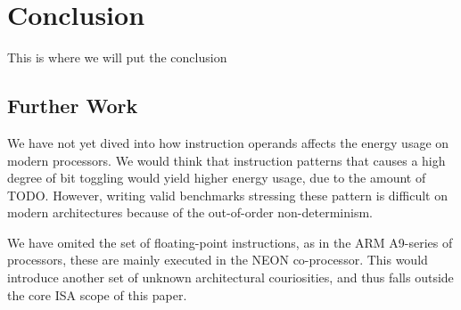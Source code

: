\section{Conclusion}
This is where we will put the conclusion

\subsection{Further Work}

We have not yet dived into how instruction operands affects the energy usage on
modern processors. We would think that instruction patterns that causes a high
degree of bit toggling would yield higher energy usage, due to the amount of
TODO. However, writing valid benchmarks stressing these pattern is difficult on
modern architectures because of the out-of-order non-determinism.

We have omited the set of floating-point instructions, as in the ARM A9-series
of processors, these are mainly executed in the NEON co-processor. This would
introduce another set of unknown architectural couriosities\cite{wolf}, and thus falls
outside the core ISA scope of this paper.
